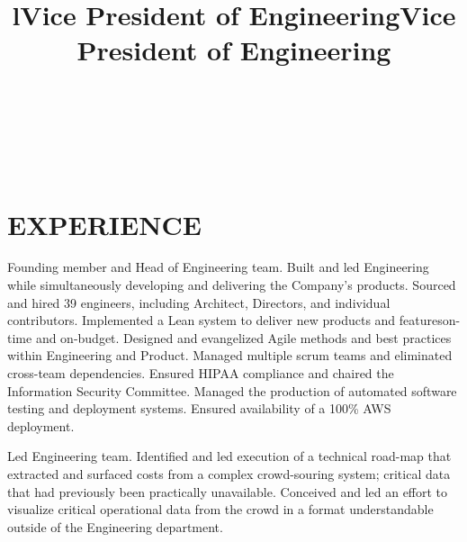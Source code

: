 \documentclass[margin]{res}
\begin{document}
\bigskip

\address{2263 Derby St.\\ken@hero.com}
\address{Berkeley, CA 94705\\(310) 383}

\begin{resume}

\begin{format}
\title{l}\\
\\
\body\\
\end{format}

\section{EXPERIENCE}
\title{\textbf{Vice President of Engineering}}
\begin{position}
\hspace*{.5cm}Founding member and Head of Engineering team.  Built and led Engineering while simultaneously developing and delivering the Company's products. Sourced and hired 39 engineers, including Architect, Directors, and individual contributors.  Implemented a Lean system to deliver new products and features\textemdash on-time and on-budget. Designed and evangelized Agile methods and best practices within Engineering and Product. Managed multiple scrum teams and eliminated cross-team dependencies.  Ensured HIPAA compliance and chaired the Information Security Committee.  Managed the production of automated software testing and deployment systems.  Ensured availability of a 100\% AWS deployment.
\end{position}

\title{\textbf{Vice President of Engineering}}
\begin{position}
\hspace*{.5cm}Led Engineering team. Identified and led execution of a technical road-map that extracted and surfaced costs from a complex crowd-souring system; critical data that had previously been practically unavailable. Conceived and led an effort to visualize critical operational data from the crowd in a format understandable outside of the Engineering department.
\end{position}


\end{resume}
\end{document}
